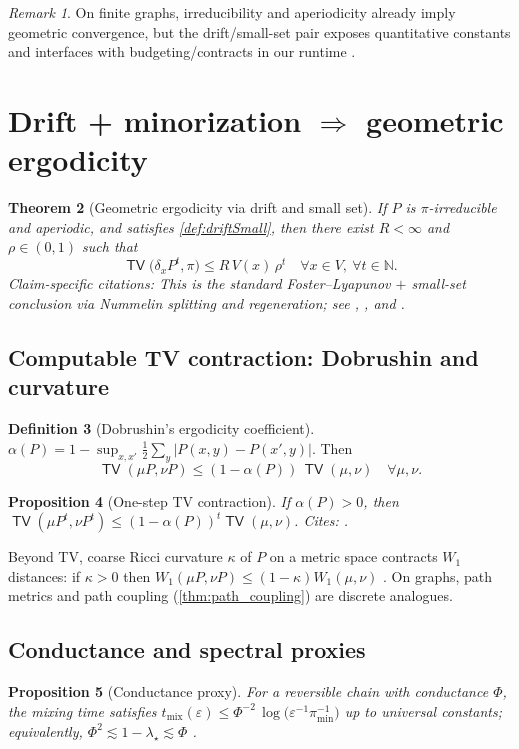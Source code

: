 \documentclass[11pt]{article}
\theoremstyle{plain}
\newtheorem{theorem}{Theorem}[section]
\newtheorem{proposition}[theorem]{Proposition}
\theoremstyle{definition}
\newtheorem{definition}[theorem]{Definition}
\theoremstyle{remark}
\newtheorem{remark}[theorem]{Remark}
\DeclareMathOperator{\TV}{\mathsf{TV}}
\newcommand{\NN}{\mathbb{N}}
\newcommand{\1}{\mathds{1}}
\begin{document}
\begin{remark}
On finite graphs, irreducibility and aperiodicity already imply geometric convergence, but the drift/small-set pair exposes quantitative constants and interfaces with budgeting/contracts in our runtime \cite{MeynTweedie2009,RobertsRosenthal2004}.
\end{remark}

\section{Drift + minorization \texorpdfstring{$\Rightarrow$}{⇒} geometric ergodicity}
\begin{theorem}[Geometric ergodicity via drift and small set]\label{thm:drift_minorization_geometric}
If $P$ is $\pi$-irreducible and aperiodic, and satisfies \cref{def:driftSmall}, then there exist $R<\infty$ and $\rho\in(0,1)$ such that
\[
\TV\!\big(\delta_x P^t,\pi\big)\le R\,V(x)\,\rho^t\quad\forall x\in V,\ \forall t\in\NN.
\]
\textit{Claim-specific citations:} This is the standard Foster--Lyapunov $+$ small-set conclusion via Nummelin splitting and regeneration; see \cite[Thm.~15.0.1]{MeynTweedie2009}, \cite{Nummelin1984}, and \cite[Sec.~2]{RobertsRosenthal2004}.
\end{theorem}

\subsection{Computable TV contraction: Dobrushin and curvature}
\begin{definition}[Dobrushin’s ergodicity coefficient]
$\alpha(P)=1-\sup_{x,x'}\tfrac{1}{2}\sum_y |P(x,y)-P(x',y)|$. Then
\[
\TV(\mu P,\nu P)\le (1-\alpha(P))\,\TV(\mu,\nu)\quad\forall\mu,\nu.
\]
\end{definition}

\begin{proposition}[One-step TV contraction]\label{prop:dobrushin}
If $\alpha(P)>0$, then $\TV(\mu P^t,\nu P^t)\le (1-\alpha(P))^t \TV(\mu,\nu)$. \textit{Cites:} \cite[Ch.~4]{Seneta2006,LevinPeresWilmer2009}.
\end{proposition}

Beyond TV, coarse Ricci curvature $\kappa$ of $P$ on a metric space contracts $W_1$ distances: if $\kappa>0$ then $W_1(\mu P,\nu P)\le (1-\kappa)W_1(\mu,\nu)$ \cite{Ollivier2009,JoulinOllivier2010}. On graphs, path metrics and path coupling (\cref{thm:path_coupling}) are discrete analogues.

\subsection{Conductance and spectral proxies}
\begin{proposition}[Conductance proxy]\label{prop:conductance}
For a reversible chain with conductance $\Phi$, the mixing time satisfies $t_{\mathrm{mix}}(\varepsilon)\le \Phi^{-2}\,\log\!\big(\varepsilon^{-1}\pi_{\min}^{-1}\big)$ up to universal constants; equivalently, $\Phi^2\lesssim 1-\lambda_\star\lesssim \Phi$ \cite[Chs.~7--13]{LevinPeresWilmer2009}.
\end{proposition}
\end{document}
